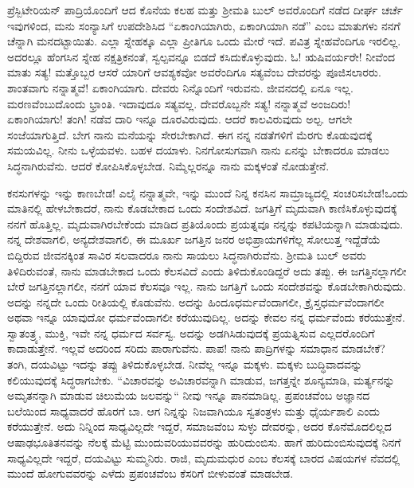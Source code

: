 ಪ್ರೆಸ್ಬಿಟೇರಿಯನ್ ಪಾದ್ರಿಯೊಂದಿಗೆ ಆದ ಕೊನೆಯ ಕಲಹ ಮತ್ತು ಶ‍್ರೀಮತಿ ಬುಲ್ ಅವರೊಂದಿಗೆ ನಡೆದ ದೀರ್ಘ ಚರ್ಚೆ ಇವುಗಳಿಂದ, ಮನು ಸಂನ್ಯಾಸಿಗೆ ಉಪದೇಶಿಸಿದ “ಏಕಾಂಗಿಯಾಗಿರು, ಏಕಾಂಗಿಯಾಗಿ ನಡೆ” ಎಂಬ ಮಾತುಗಳು ನನಗೆ ಚೆನ್ನಾಗಿ ಮನದಟ್ಟಾಯಿತು. ಎಲ್ಲಾ ಸ್ನೇಹಕ್ಕೂ ಎಲ್ಲಾ ಪ್ರೀತಿಗೂ ಒಂದು ಮೇರೆ ಇದೆ. ಪವಿತ್ರ ಸ್ನೇಹವೆಂದಿಗೂ ಇರಲಿಲ್ಲ. ಅದರಲ್ಲೂ ಹೆಂಗಸಿನ ಸ್ನೇಹ ನಕ್ಷತ್ರಿಕನಂತೆ, ಸ್ವಲ್ಪವನ್ನೂ ಬಿಡದೆ ಕಸಿದುಕೊಳ್ಳುವುದು. ಓ! ಋಷಿವರ್ಯರೇ! ನೀವೆಂದ ಮಾತು ಸತ್ಯ! ಮತ್ತೊಬ್ಬರ ಆಸರೆ ಯಾರಿಗೆ ಆವಶ್ಯಕವೋ ಅವರೆಂದಿಗೂ ಸತ್ಯವೆಂಬ ದೇವರನ್ನು ಪೂಜಿಸಲಾರರು. ಶಾಂತವಾಗು ನನ್ನಾತ್ಮವೆ! ಏಕಾಂಗಿಯಾಗು. ದೇವರು ನಿನ್ನೊಂದಿಗೆ ಇರುವನು. ಜೀವನದಲ್ಲಿ ಏನೂ ಇಲ್ಲ. ಮರಣವೆಂಬುದೊಂದು ಭ್ರಾಂತಿ. ಇದಾವುದೂ ಸತ್ಯವಲ್ಲ. ದೇವರೊಬ್ಬನೇ ಸತ್ಯ! ನನ್ನಾತ್ಮವೆ ಅಂಜದಿರು! ಏಕಾಂಗಿಯಾಗು! ತಂಗಿ! ನಡೆವ ದಾರಿ ಇನ್ನೂ ದೂರವಿರುವುದು. ಆದರೆ ಕಾಲವಿರುವುದು ಅಲ್ಪ. ಆಗಲೇ ಸಂಜೆಯಾಗುತ್ತಿದೆ. ಬೇಗ ನಾನು ಮನೆಯನ್ನು ಸೇರಬೇಕಾಗಿದೆ. ಈಗ ನನ್ನ ನಡತೆಗಳಿಗೆ ಮೆರಗು ಕೊಡುವುದಕ್ಕೆ ಸಮಯವಿಲ್ಲ. ನೀನು ಒಳ್ಳೆಯವಳು. ಬಹಳ ದಯಾಳು. ನಿನಗೋಸುಗವಾಗಿ ನಾನು ಏನನ್ನು ಬೇಕಾದರೂ ಮಾಡಲು ಸಿದ್ಧನಾಗಿರುವೆನು. ಆದರೆ ಕೋಪಿಸಿಕೊಳ್ಳಬೇಡ. ನಿಮ್ಮೆಲ್ಲರನ್ನೂ ನಾನು ಮಕ್ಕಳಂತೆ ನೋಡುತ್ತೇನೆ.

ಕನಸುಗಳನ್ನು ಇನ್ನು ಕಾಣಬೇಡ! ಎಲೈ ನನ್ನಾತ್ಮವೇ, ಇನ್ನು ಮುಂದೆ ನಿನ್ನ ಕನಸಿನ ಸಾಮ್ರಾಜ್ಯದಲ್ಲಿ ಸಂಚರಿಸಬೇಡ!ಒಂದು ಮಾತಿನಲ್ಲಿ ಹೇಳಬೇಕಾದರೆ, ನಾನು ಕೊಡಬೇಕಾದ ಒಂದು ಸಂದೇಶವಿದೆ. ಜಗತ್ತಿಗೆ ಮೃದುವಾಗಿ ಕಾಣಿಸಿಕೊಳ್ಳುವುದಕ್ಕೆ ನನಗೆ ಹೊತ್ತಿಲ್ಲ. ಮೃದುವಾಗಿರಬೇಕೆಂದು ಮಾಡಿದ ಪ್ರತಿಯೊಂದು ಪ್ರಯತ್ನವೂ ನನ್ನನ್ನು ಕಪಟಿಯನ್ನಾಗಿ ಮಾಡುವುದು. ನನ್ನ ದೇಶವಾಗಲಿ, ಅನ್ಯದೇಶವಾಗಲಿ, ಈ ಮೂರ್ಖ ಜಗತ್ತಿನ ಜನರ ಅಭಿಪ್ರಾಯಗಳಿಗೆಲ್ಲ ಸೋಲುತ್ತ ಇದ್ದೆಡೆಯೆ ಬಿದ್ದಿರುವ ಜೀವನಕ್ಕಿಂತ ಸಾವಿರ ಸಲವಾದರೂ ನಾನು ಸಾಯಲು ಸಿದ್ಧನಾಗಿರುವೆನು. ಶ‍್ರೀಮತಿ ಬುಲ್ ಅವರು ತಿಳಿದಿರುವಂತೆ, ನಾನು ಮಾಡಬೇಕಾದ ಒಂದು ಕೆಲಸವಿದೆ ಎಂದು ತಿಳಿದುಕೊಂಡಿದ್ದರೆ ಅದು ತಪ್ಪು. ಈ ಜಗತ್ತಿನಲ್ಲಾಗಲೀ ಬೇರೆ ಜಗತ್ತಿನಲ್ಲಾಗಲೀ, ನನಗೆ ಯಾವ ಕೆಲಸವೂ ಇಲ್ಲ. ನಾನು ಜಗತ್ತಿಗೆ ಒಂದು ಸಂದೇಶವನ್ನು ಕೊಡಬೇಕಾಗಿರುವುದು. ಅದನ್ನು ನನ್ನದೇ ಒಂದು ರೀತಿಯಲ್ಲಿ ಕೊಡುವೆನು. ಅದನ್ನು ಹಿಂದೂಧರ್ಮವೆಂದಾಗಲೀ, ಕ್ರೈಸ್ತಧರ್ಮವೆಂದಾಗಲೀ ಅಥವಾ ಇನ್ನೂ ಯಾವುದೋ ಧರ್ಮವೆಂದಾಗಲೀ ಕರೆಯುವುದಿಲ್ಲ. ಅದನ್ನು ಕೇವಲ ನನ್ನ ಧರ್ಮವೆಂದು ಕರೆಯುತ್ತೇನೆ. ಸ್ವಾತಂತ್ರ್ಯ, ಮುಕ್ತಿ, ಇವೇ ನನ್ನ ಧರ್ಮದ ಸರ್ವಸ್ವ. ಅದನ್ನು ಅಡಗಿಸಿಡುವುದಕ್ಕೆ ಪ್ರಯತ್ನಿಸುವ ಎಲ್ಲದರೊಂದಿಗೆ ಕಾದಾಡುತ್ತೇನೆ. ಇಲ್ಲವೆ ಅದರಿಂದ ಸರಿದು ಪಾರಾಗುವೆನು. ಪಾಪ! ನಾನು ಪಾದ್ರಿಗಳನ್ನು ಸಮಾಧಾನ ಮಾಡಬೇಕೆ? ತಂಗಿ, ದಯವಿಟ್ಟು ಇದನ್ನು ತಪ್ಪು ತಿಳಿದುಕೊಳ್ಳಬೇಡ. ನೀವೆಲ್ಲ ಇನ್ನೂ ಮಕ್ಕಳು. ಮಕ್ಕಳು ಬುದ್ಧಿವಾದವನ್ನು ಕಲಿಯುವುದಕ್ಕೆ ಸಿದ್ಧರಾಗಬೇಕು. “ವಿಚಾರವನ್ನು ಅವಿಚಾರವನ್ನಾಗಿ ಮಾಡುವ, ಜಗತ್ತನ್ನೇ ಶೂನ್ಯಮಾಡಿ, ಮರ್ತ್ಯನನ್ನು ಅಮೃತನನ್ನಾಗಿ ಮಾಡುವ ಚಿಲುಮೆಯ ಜಲವನ್ನು“ ನೀವು ಇನ್ನೂ ಪಾನಮಾಡಿಲ್ಲ. ಪ್ರಪಂಚವೆಂಬ ಅಜ್ಞಾನದ ಬಲೆಯಿಂದ ಸಾಧ್ಯವಾದರೆ ಹೊರಗೆ ಬಾ. ಆಗ ನಿನ್ನನ್ನು ನಿಜವಾಗಿಯೂ ಸ್ವತಂತ್ರಳು ಮತ್ತು ಧೈರ್ಯಶಾಲಿ ಎಂದು ಕರೆಯುತ್ತೇನೆ. ಅದು ನಿನ್ನಿಂದ ಸಾಧ್ಯವಿಲ್ಲದೇ ಇದ್ದರೆ, ಸಮಾಜವೆಂಬ ಸುಳ್ಳು ದೇವರನ್ನು, ಅದರ ಕೊನೆಮೊದಲಿಲ್ಲದ ಆಷಾಢಭೂತಿತನವನ್ನು ನೆಲಕ್ಕೆ ಮೆಟ್ಟಿ ಮುಂದುವರಿಯುವವರನ್ನು ಹುರಿದುಂಬಿಸು. ಹಾಗೆ ಹುರಿದುಂಬಿಸುವುದಕ್ಕೆ ನಿನಗೆ ಸಾಧ್ಯವಿಲ್ಲದೇ ಇದ್ದರೆ, ದಯವಿಟ್ಟು ಸುಮ್ಮನಿರು. ರಾಜಿ, ಮೃದುಮಧುರ ಎಂಬ ಕೆಲಸಕ್ಕೆ ಬಾರದ ವಿಷಯಗಳ ನೆವದಲ್ಲಿ ಮುಂದೆ ಹೋಗುವವರನ್ನು ಎಳೆದು ಪ್ರಪಂಚವೆಂಬ ಕೆಸರಿಗೆ ಬೀಳುವಂತೆ ಮಾಡಬೇಡ.
\vspace{0.2cm}

